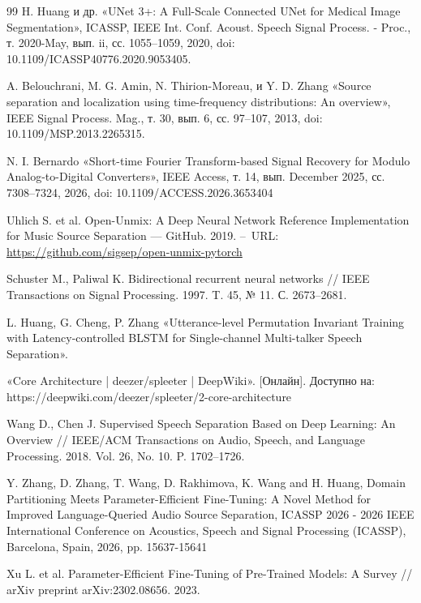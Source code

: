 \documentclass[14pt]{extarticle}
\begin{document}
\begin{thebibliography}{99}
	H. Huang и др. «UNet 3+: A Full-Scale Connected UNet for Medical Image Segmentation», ICASSP, IEEE Int. Conf. Acoust. Speech Signal Process. - Proc., т. 2020-May, вып. ii, сс. 1055–1059, 2020, doi: 10.1109/ICASSP40776.2020.9053405.

	A. Belouchrani, M. G. Amin, N. Thirion-Moreau, и Y. D. Zhang «Source separation and localization using time-frequency distributions: An overview», IEEE Signal Process. Mag., т. 30, вып. 6, сс. 97–107, 2013, doi: 10.1109/MSP.2013.2265315.

	N. I. Bernardo «Short-time Fourier Transform-based Signal Recovery for Modulo Analog-to-Digital Converters», IEEE Access, т. 14, вып. December 2025, сс. 7308–7324, 2026, doi: 10.1109/ACCESS.2026.3653404

	Uhlich S. et al. Open-Unmix: A Deep Neural Network Reference Implementation for Music Source Separation --- GitHub. 2019. --~URL: \href{https://github.com/sigsep/open-unmix-pytorch}{https://github.com/sigsep/open-unmix-pytorch}
	
	Schuster M., Paliwal K. Bidirectional recurrent neural networks // IEEE Transactions on Signal Processing. 1997. T. 45, № 11. С. 2673–2681.

	L. Huang, G. Cheng, P. Zhang «Utterance-level Permutation Invariant Training with Latency-controlled BLSTM for Single-channel Multi-talker Speech Separation».

	«Core Architecture | deezer/spleeter | DeepWiki». [Онлайн]. Доступно на: https://deepwiki.com/deezer/spleeter/2-core-architecture

	Wang D., Chen J. Supervised Speech Separation Based on Deep Learning: An Overview // IEEE/ACM Transactions on Audio, Speech, and Language Processing. 2018. Vol. 26, No. 10. P. 1702–1726.

	Y. Zhang, D. Zhang, T. Wang, D. Rakhimova, K. Wang and H. Huang, Domain Partitioning Meets Parameter-Efficient Fine-Tuning: A Novel Method for Improved Language-Queried Audio Source Separation, ICASSP 2026 - 2026 IEEE International Conference on Acoustics, Speech and Signal Processing (ICASSP), Barcelona, Spain, 2026, pp. 15637-15641

	Xu L. et al. Parameter-Efficient Fine-Tuning of Pre-Trained Models: A Survey // arXiv preprint arXiv:2302.08656. 2023.


\end{thebibliography}
\end{document}
